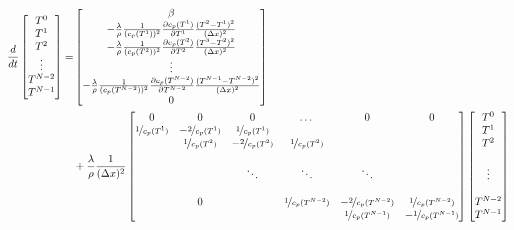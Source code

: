 \documentclass{scrartcl}[12pt, halfparskip]
\begin{document}
\begin{align*}
	\frac{d}{dt} \begin{bmatrix*}
	T^0 \\
	T^1 \\
	T^2 \\
	\vdots \\
	T^{N-2} \\
	T^{N-1}
	\end{bmatrix*} = &
	\begin{bmatrix}
		\beta \\
		- \frac{\lambda}{\rho} \frac{1}{(c_p(T^1))^2} \frac{\partial c_p (T^1)}{\partial T^1} \frac{(T^2 - T^1)^2}{(\Delta x)^2} \\
		- \frac{\lambda}{\rho} \frac{1}{(c_p(T^2))^2} \frac{\partial c_p (T^2)}{\partial T^2} \frac{(T^3 - T^2)^2}{(\Delta x)^2} \\
		\vdots \\
		- \frac{\lambda}{\rho} \frac{1}{(c_p(T^{N-2}))^2} \frac{\partial c_p (T^{N-2})}{\partial T^{N-2}} \frac{(T^{N-1} - T^{N-2})^2}{(\Delta x)^2} \\	
		0 \\			
	\end{bmatrix} \\
	& + \frac{\lambda}{\rho} \frac{1}{(\Delta x)^2}
	\begin{bmatrix}
		0 & 0 & 0 & \dots & 0 & 0 \\
		\nicefrac{1}{c_p(T^1)} & -\nicefrac{2}{c_p(T^1)} & \nicefrac{1}{c_p(T^1)} & & &  \\
		& \nicefrac{1}{c_p(T^2)} & -\nicefrac{2}{c_p(T^2)} & \nicefrac{1}{c_p(T^2)} & \\
		\\
		& & \ddots & \ddots & \ddots \\
		\\
		& 0 & &  \nicefrac{1}{c_p(T^{N-2})} & -\nicefrac{2}{c_p(T^{N-2})} & \nicefrac{1}{c_p(T^{N-2})} \\
		& & & & \nicefrac{1}{c_p(T^{N-1})} & -\nicefrac{1}{c_p(T^{N-1})}
	\end{bmatrix}
	\begin{bmatrix*}
		T^0 \\
		T^1 \\
		T^2 \\
		\\
		\vdots \\
		\\
		T^{N-2} \\
		T^{N-1}
	\end{bmatrix*}
\end{align*}
\end{document}
